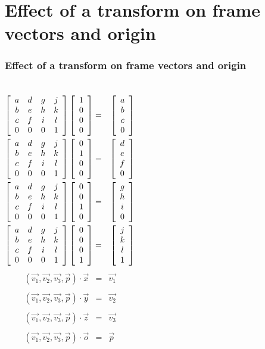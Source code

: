 \documentclass[slidestop,xcolor=pst,dvips]{beamer}
\newcommand{\sect}[1]{
\section{#1}
\begin{frame}[fragile]\frametitle{#1}
}
\begin{document}
\sect{Effect of a transform on frame vectors and origin}
\begin{columns}
{\small
\begin{eqnarray*}
\left[\begin{array}{cccc} a & d & g & j  \\ b & e & h & k \\ c & f & i & l \\0&0&0&1\end{array}\right]
\left[\begin{array}{c} 1\\0\\0 \\ 0\end{array}\right]
 &=& \left[\begin{array}{c} a\\b\\c \\ 0\end{array}\right]\\
\left[\begin{array}{cccc} a & d & g & j  \\ b & e & h & k \\ c & f & i & l \\0&0&0&1\end{array}\right]
\left[\begin{array}{c} 0\\1\\0 \\ 0\end{array}\right]
 &=& \left[\begin{array}{c} d\\e\\f \\ 0\end{array}\right]\\
\left[\begin{array}{cccc} a & d & g & j  \\ b & e & h & k \\ c & f & i & l \\0&0&0&1\end{array}\right]
\left[\begin{array}{c} 0\\0\\1 \\ 0\end{array}\right]
 &=& \left[\begin{array}{c} g\\h\\i \\ 0\end{array}\right]\\
\left[\begin{array}{cccc} a & d & g & j  \\ b & e & h & k \\ c & f & i & l \\0&0&0&1\end{array}\right]
\left[\begin{array}{c} 0\\0\\0 \\ 1\end{array}\right]
 &=& \left[\begin{array}{c} j\\k\\l \\ 1\end{array}\right]\\
\end{eqnarray*}
}
\pause
{}
\begin{eqnarray*}
(\vec{v_1}, \vec{v_2}, \vec{v_3}, \vec{p})\cdot\vec{x} &=& \vec{v_1}\\\\
(\vec{v_1}, \vec{v_2}, \vec{v_3}, \vec{p})\cdot\vec{y} &=& \vec{v_2}\\\\
(\vec{v_1}, \vec{v_2}, \vec{v_3}, \vec{p})\cdot\vec{z} &=& \vec{v_3}\\\\
(\vec{v_1}, \vec{v_2}, \vec{v_3}, \vec{p})\cdot\vec{o} &=& \vec{p}
\end{eqnarray*}
\end{columns}
\end{frame}
\end{document}
